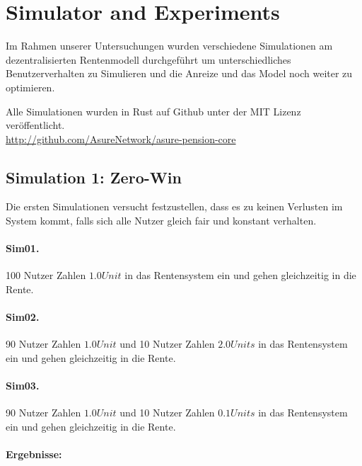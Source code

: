 \section{Simulator and Experiments}

Im Rahmen unserer Untersuchungen wurden verschiedene Simulationen am dezentralisierten Rentenmodell durchgeführt um unterschiedliches Benutzerverhalten zu Simulieren und die Anreize und das Model noch weiter zu optimieren.

Alle Simulationen wurden in Rust auf Github unter der MIT Lizenz veröffentlicht.\\
\url{http://github.com/AsureNetwork/asure-pension-core}

\subsection{Simulation 1: Zero-Win}

Die ersten Simulationen versucht festzustellen, dass es zu keinen Verlusten im System kommt, falls sich alle Nutzer gleich fair und konstant verhalten.

\paragraph{Sim01.} 100 Nutzer Zahlen $1.0 Unit$ in das Rentensystem ein und gehen gleichzeitig in die Rente.

\paragraph{Sim02.} 90 Nutzer Zahlen $1.0 Unit$ und 10 Nutzer Zahlen $2.0 Units$ in das Rentensystem ein und gehen gleichzeitig in die Rente.

\paragraph{Sim03.} 90 Nutzer Zahlen $1.0 Unit$ und 10 Nutzer Zahlen $0.1 Units$ in das Rentensystem ein und gehen gleichzeitig in die Rente.

\paragraph{Ergebnisse:}

\begin{table}[hbt!]
\centering
{}
\end{table}

